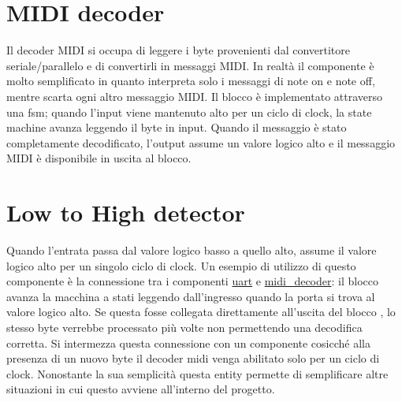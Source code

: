 \section{MIDI decoder}
\label{sec:mididec}

\begin{center}
\end{center}
Il decoder MIDI si occupa di leggere i byte provenienti dal convertitore seriale/parallelo e di convertirli in messaggi MIDI.
In realtà il componente è molto semplificato in quanto interpreta solo i messaggi di note on e note off, mentre scarta ogni altro messaggio MIDI.
Il blocco è implementato attraverso una fsm; quando l'input  viene mantenuto alto per un ciclo di clock, la state machine avanza leggendo il byte  in input.
Quando il messaggio è stato completamente decodificato, l'output  assume un valore logico alto e il messaggio MIDI è disponibile in uscita al blocco.

\section{Low to High detector}
\label{sec:lowhigh}

\begin{center}
\end{center}

Quando l'entrata  passa dal valore logico basso a quello alto,
 assume il valore logico alto per un singolo ciclo di clock.
Un esempio di utilizzo di questo componente è la connessione tra i componenti
\hyperref[sec:uart]{uart} e \hyperref[sec:mididec]{midi\_decoder}: il blocco
 avanza la macchina a stati leggendo dall'ingresso quando
la porta  si trova al valore logico alto. Se questa fosse
collegata direttamente all'uscita  del blocco ,
lo stesso byte verrebbe processato più volte non permettendo una decodifica
corretta. Si intermezza questa connessione con un componente 
cosicché alla presenza di un nuovo byte il decoder midi venga abilitato solo per
un ciclo di clock.
Nonostante la sua semplicità questa entity permette di semplificare altre situazioni
in cui questo avviene all'interno del progetto.

